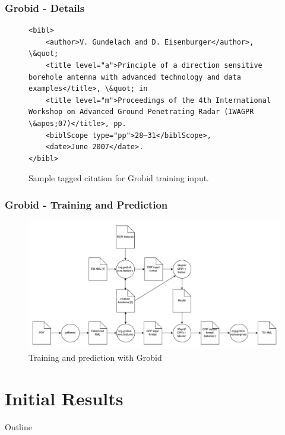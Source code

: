 \documentclass{beamer}
\begin{document}

\begin{frame}[fragile]
\frametitle{Grobid - Details}

\begin{figure}
\lstset{language=XML}
\begin{lstlisting}
<bibl>
	<author>V. Gundelach and D. Eisenburger</author>, \&quot; 
	<title level="a">Principle of a direction sensitive borehole antenna with advanced technology and data examples</title>, \&quot; in 
	<title level="m">Proceedings of the 4th International Workshop on Advanced Ground Penetrating Radar (IWAGPR \&apos;07)</title>, pp. 
	<biblScope type="pp">28–31</biblScope>, 
	<date>June 2007</date>.
</bibl>
\end{lstlisting}
\caption{Sample tagged citation for Grobid training input.}
\end{figure}

\end{frame}


\begin{frame}
\frametitle{Grobid - Training and Prediction}
\begin{figure}[!ht]
\center
\includegraphics[width=4.5in]{figures/grobid.pdf}
\caption{Training and prediction with Grobid}
\end{figure}
\end{frame}


\section{Initial Results}
\begin{frame}[noframenumbering]{Outline}
\tableofcontents[currentsection]
\end{frame}
\end{document}

